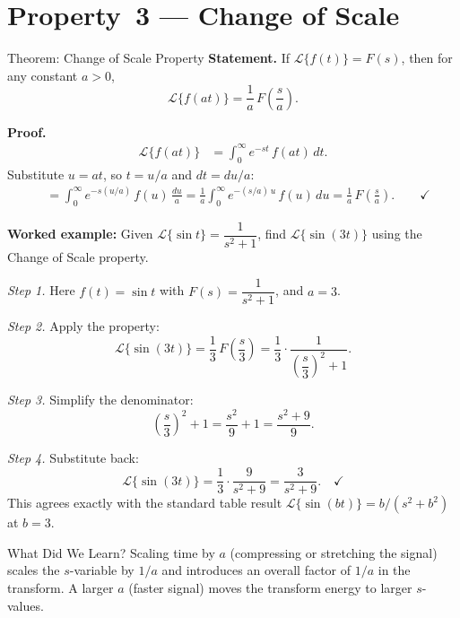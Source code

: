 \documentclass[12pt,a4paper]{article}
\begin{document}
\section{Property~3 --- Change of Scale}

\begin{infobox}{Theorem: Change of Scale Property}
\textbf{Statement.} If $\mathcal{L}\{f(t)\} = F(s)$, then for any constant $a > 0$,
\[
  \mathcal{L}\{f(at)\} = \frac{1}{a}\,F\!\left(\frac{s}{a}\right).
\]

\textbf{Proof.}
\begin{align*}
  \mathcal{L}\{f(at)\}
  &= \int_0^{\infty} e^{-st}\,f(at)\,dt.
\end{align*}
Substitute $u = at$, so $t = u/a$ and $dt = du/a$:
\begin{align*}
  &= \int_0^{\infty} e^{-s(u/a)}\,f(u)\,\frac{du}{a}
   = \frac{1}{a}\int_0^{\infty} e^{-(s/a)\,u}\,f(u)\,du
   = \frac{1}{a}\,F\!\left(\frac{s}{a}\right). \qquad \checkmark
\end{align*}

\textbf{Worked example: } Given $\mathcal{L}\{\sin t\} = \dfrac{1}{s^2+1}$, find
$\mathcal{L}\{\sin(3t)\}$ using the Change of Scale property.

\emph{Step 1.} Here $f(t) = \sin t$ with $F(s) = \dfrac{1}{s^2+1}$, and $a = 3$.

\emph{Step 2.} Apply the property:
\[
  \mathcal{L}\{\sin(3t)\}
  = \frac{1}{3}\,F\!\left(\frac{s}{3}\right)
  = \frac{1}{3}\cdot\frac{1}{\left(\dfrac{s}{3}\right)^2 + 1}.
\]

\emph{Step 3.} Simplify the denominator:
\[
  \left(\frac{s}{3}\right)^2 + 1 = \frac{s^2}{9} + 1 = \frac{s^2 + 9}{9}.
\]

\emph{Step 4.} Substitute back:
\[
  \mathcal{L}\{\sin(3t)\}
  = \frac{1}{3}\cdot\frac{9}{s^2+9}
  = \frac{3}{s^2+9}. \quad \checkmark
\]
This agrees exactly with the standard table result $\mathcal{L}\{\sin(bt)\} = b/(s^2+b^2)$ at $b=3$.
\end{infobox}

\begin{learnbox}{What Did We Learn?}
Scaling time by $a$ (compressing or stretching the signal) scales the $s$-variable by $1/a$
and introduces an overall factor of $1/a$ in the transform. A larger $a$ (faster signal)
moves the transform energy to larger $s$-values.
\end{learnbox}
\end{document}
